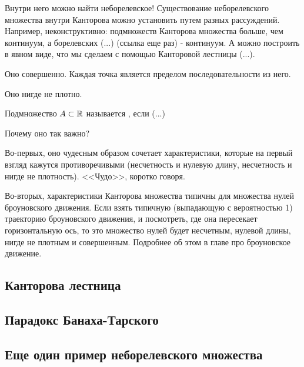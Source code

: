 {Внутри него можно найти неборелевское! Существование неборелевского множества внутри Канторова можно установить путем разных рассуждений. Например, неконструктивно: подмножеств Канторова множества больше, чем континуум, а борелевских (...) (ссылка еще раз) - континуум. А можно построить в явном виде, что мы сделаем с помощью Канторовой лестницы (...).


Оно совершенно. Каждая точка является пределом последовательности из него.

Оно нигде не плотно.

\begin{mydef} Подмножество $A\subset \mathbb R$ называется , если (...)
\end{mydef}



Почему оно так важно?

Во-первых, оно чудесным образом сочетает характеристики, которые на первый взгляд кажутся противоречивыми (несчетность и нулевую длину, несчетность и нигде не плотность). <<Чудо>>, коротко говоря.

Во-вторых, характеристики Канторова множества типичны для множества нулей броуновского движения. Если взять типичную (выпадающую с вероятностью 1) траекторию броуновского движения, и посмотреть, где она пересекает горизонтальную ось, то это множество нулей будет несчетным, нулевой длины, нигде не плотным и совершенным. Подробнее об этом в главе про броуновское движение.

}\subsection{Канторова лестница} \problemtext{


}\subsection{Парадокс Банаха-Тарского} \problemtext{

}\subsection{Еще один пример неборелевского множества} 
